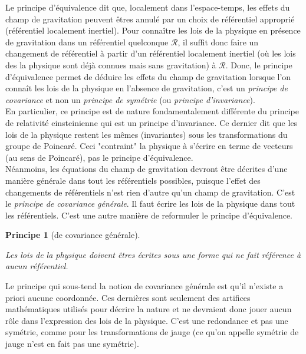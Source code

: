 \documentclass[a4paper,11pt]{report}
\theoremstyle{definition}
\theoremstyle{plain}
\newtheorem{prin}[thm]{Principe}
\theoremstyle{definition}
\theoremstyle{remark}
\newcommand{\R}{\mathcal{R}}
\begin{document}
            Le principe d'équivalence dit que, localement dans l'espace-temps, les effets du champ de gravitation peuvent êtres annulé par un choix de référentiel approprié (référentiel localement inertiel). Pour connaître les lois de la physique en présence de gravitation dans un référentiel quelconque $\R$, il suffit donc faire un changement de référentiel à partir d'un référentiel localement inertiel (où les lois des la physique sont déjà connues mais sans gravitation) à $\R$. Donc, le principe d'équivalence permet de déduire les effets du champ de gravitation lorsque l'on connaît les lois de la physique en l'absence de gravitation, c'est un \textit{principe de covariance} et non un \textit{principe de symétrie} (ou \textit{principe d'invariance}).\\
            
            En particulier, ce principe est de nature fondamentalement différente du principe de relativité einsteinienne qui est un principe d'invariance. Ce dernier dit que les lois de la physique restent les mêmes (invariantes) sous les transformations du groupe de Poincaré. Ceci "contraint" la physique à s'écrire en terme de vecteurs (au sens de Poincaré), pas le principe d'équivalence.\\
            
            Néanmoins, les équations du champ de gravitation devront être décrites d'une manière générale dans tout les référentiels possibles, puisque l'effet des changements de référentiels n'est rien d'autre qu'un champ de gravitation. C'est le \textit{principe de covariance générale}. Il faut écrire les lois de la physique dans tout les référentiels. C'est une autre manière de reformuler le principe d'équivalence.
            
            \begin{prin}[de covariance générale]
            \begin{leftbar}
            Les lois de la physique doivent êtres écrites sous une forme qui ne fait référence à aucun référentiel.
            \end{leftbar}
            \end{prin}
            
            Le principe qui sous-tend la notion de covariance générale est qu'il n'existe a priori aucune coordonnée. Ces dernières sont seulement des artifices mathématiques utilisés pour décrire la nature et ne devraient donc jouer aucun rôle dans l'expression des lois de la physique. C'est une redondance et pas une symétrie, comme pour les transformations de jauge (ce qu'on appelle symétrie de jauge n'est en fait pas une symétrie).
    
\end{document}
